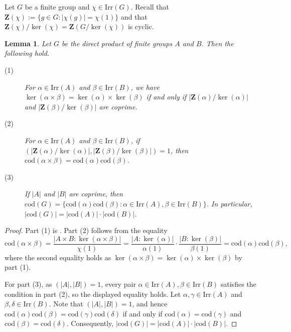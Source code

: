 \documentclass[9pt]{article}
\newtheorem{lem}{\bf Lemma}[section]
\begin{document}
Let $G$ be a finite group and $\chi\in \mathrm{Irr}(G)$.
Recall that $\mathbf{Z}(\chi):=\{ g\in G: |\chi(g)|=\chi(1) \}$ and that $\mathbf{Z}(\chi)/\ker(\chi)=\mathbf{Z}(G/\ker(\chi))$ is cyclic.






\begin{lem}\label{lem: direct product, kernel and codegrees}
	Let $G$ be the direct product of finite groups $A$ and $B$.
	Then the following hold.
	\begin{description}
		\item[(1)] For $\alpha \in \mathrm{Irr}(A)$ and $\beta \in \mathrm{Irr}(B)$, 
		we have $\ker(\alpha\times \beta)=\ker(\alpha)\times \ker(\beta)$ if and only if $|\mathbf{Z}(\alpha)/\ker(\alpha)|$ and $|\mathbf{Z}(\beta)/\ker(\beta)|$ are coprime. 
		\item[(2)] 
		For $\alpha \in \mathrm{Irr}(A)$ and $\beta \in \mathrm{Irr}(B)$,
		if $(|\mathbf{Z}(\alpha)/\ker(\alpha)|,|\mathbf{Z}(\beta)/\ker(\beta)|)=1$,
		then $\mathrm{cod}(\alpha\times \beta)=\mathrm{cod}(\alpha)\mathrm{cod}(\beta)$.
		\item[(3)] If $|A|$ and $|B|$ are coprime, then $\mathrm{cod}(G)=\{ \mathrm{cod}(\alpha)\mathrm{cod}(\beta):\alpha \in \mathrm{Irr}(A),\beta\in \mathrm{Irr}(B) \}$.
		In particular, $|\mathrm{cod}(G)|=|\mathrm{cod}(A)|\cdot |\mathrm{cod}(B)|$.
	\end{description} 
\end{lem}
\begin{proof}
  Part (1) is \cite[Problem 4.3]{isaacs1994}.  
 Part (2) follows from the equality
\[
\mathrm{cod}(\alpha\times\beta)=\frac{|A\times B:\ker(\alpha\times \beta)|}{\chi(1)}=\frac{|A:\ker(\alpha)|}{\alpha(1)}\cdot\frac{|B:\ker(\beta)|}{\beta(1)}=\mathrm{cod}(\alpha)\mathrm{cod}(\beta),
\]
where the second equality holds as $\ker(\alpha\times \beta)=\ker(\alpha)\times \ker(\beta)$ by part (1).	

For part (3), as $(|A|,|B|)=1$, every pair $\alpha \in \mathrm{Irr}(A), \beta  \in \mathrm{Irr}(B)$ satisfies the condition in part (2), so the displayed equality holds.  
Let $\alpha,\gamma\in \mathrm{Irr}(A)$ and $\beta, \delta\in \mathrm{Irr}(B)$.
Note that $(|A|,|B|)=1$,
	and hence 
	$\mathrm{cod}(\alpha)\mathrm{cod}(\beta)=\mathrm{cod}(\gamma)\mathrm{cod}(\delta)$ if and only if $\mathrm{cod}(\alpha)=\mathrm{cod}(\gamma)$ and $\mathrm{cod}(\beta)=\mathrm{cod}(\delta)$.
	Consequently, $|\mathrm{cod}(G)|=|\mathrm{cod}(A)|\cdot |\mathrm{cod}(B)|$.
\end{proof}
\end{document}
